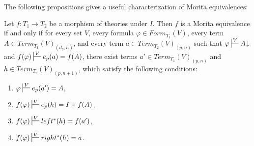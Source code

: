 \documentclass[reqno]{amsart}
\theoremstyle{definition}
\theoremstyle{remark}
\numberwithin{figure}{section}
\begin{document}
The following propositions gives a useful characterization of Morita equivalences:

\begin{prop}[mor-eq]
Let $f : T_1 \to T_2$ be a morphism of theories under $I$.
Then $f$ is a Morita equivalence if and only if for every set $V$, every formula $\varphi \in Form_{T_1}(V)$,
every term $A \in Term_{T_1}(V)_{(d_p,n)}$, and every term $a \in Term_{T_2}(V)_{(p,n)}$ such that $\varphi \sststile{}{V} A\!\downarrow$ and $f(\varphi) \sststile{}{V} e_p(a) = f(A)$,
there exist terms $a' \in Term_{T_1}(V)_{(p,n)}$ and $h \in Term_{T_2}(V)_{(p,n+1)}$, which satisfy the following conditions:
\begin{enumerate}
\item \label{it:mcf} $\varphi \sststile{}{V} e_p(a') = A$,
\item \label{it:mcs} $f(\varphi) \sststile{}{V} e_p(h) = I \times f(A)$,
\item \label{it:mct} $f(\varphi) \sststile{}{V} left^*(h) = f(a')$,
\item \label{it:mcl} $f(\varphi) \sststile{}{V} right^*(h) = a$.
\end{enumerate}
\end{prop}
\end{document}
